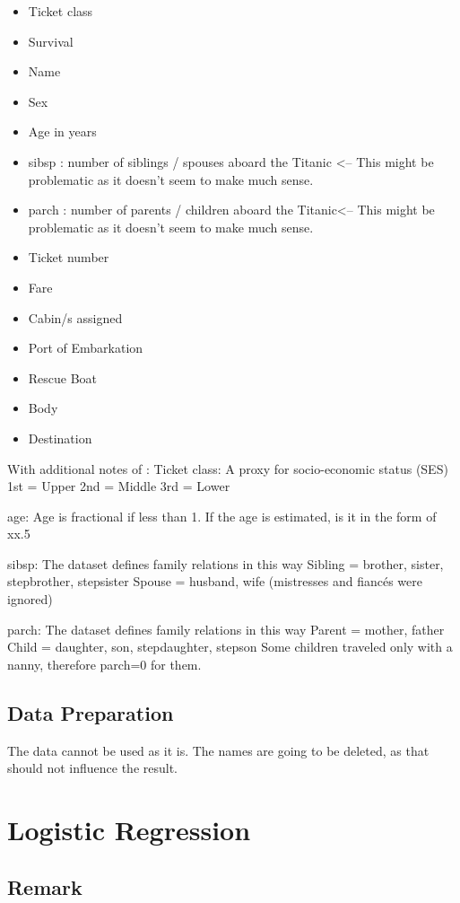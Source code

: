 \documentclass{article}
\begin{document}
\begin{itemize}
\item Ticket class
\item Survival 
\item Name
\item Sex
\item Age in years
\item sibsp : number of siblings / spouses aboard the Titanic <-- This might be problematic as it doesn't seem to make much sense.
\item parch : number of parents / children aboard the Titanic<-- This might be problematic as it doesn't seem to make much sense.
\item Ticket number	
\item Fare
\item Cabin/s assigned
\item Port of Embarkation	
\item Rescue Boat
\item Body
\item Destination
\end{itemize}

With additional notes of :
Ticket class: A proxy for socio-economic status (SES)
1st = Upper
2nd = Middle
3rd = Lower

age: Age is fractional if less than 1. If the age is estimated, is it in the form of xx.5

sibsp: The dataset defines family relations in this way
Sibling = brother, sister, stepbrother, stepsister
Spouse = husband, wife (mistresses and fiancés were ignored)

parch: The dataset defines family relations in this way
Parent = mother, father
Child = daughter, son, stepdaughter, stepson
Some children traveled only with a nanny, therefore parch=0 for them.



\subsection{Data Preparation}
The data cannot be used as it is.
The names are going to be deleted, as that should not influence the result.

\section{Logistic Regression}
\subsection{Remark}
\end{document}

